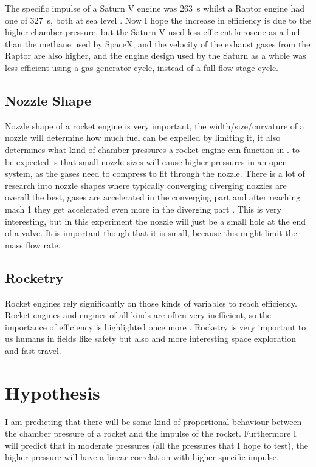 \documentclass[12pt,a4paper]{article}
\begin{document}
The specific impulse of a Saturn V engine was \SI{263}{\second} whilst a Raptor engine had one of \SI{327}{\second}, both at sea level \cite{ref8}. Now I hope the increase in efficiency is due to the higher chamber pressure, but the Saturn V used less efficient kerosene as a fuel than the methane used by SpaceX, and the velocity of the exhaust gases from the Raptor are also higher, and the engine design used by the Saturn as a whole was less efficient using a gas generator cycle, instead of a full flow stage cycle.

\subsection{Nozzle Shape}

Nozzle shape of a rocket engine is very important, the width/size/curvature of a nozzle will determine how much fuel can be expelled by limiting it, it also determines what kind of chamber pressures a rocket engine can function in \cite{ref10}. to be expected is that small nozzle sizes will cause higher pressures in an open system, as the gases need to compress to fit through the nozzle. There is a lot of research into nozzle shapes where typically converging diverging nozzles are overall the best, gases are accelerated in the converging part and after reaching mach 1 they get accelerated even more in the diverging part \cite{ref11}. This is very interesting, but in this experiment the nozzle will just be a small hole at the end of a valve. It is important though that it is small, because this might limit the mass flow rate.

\subsection{Rocketry}

Rocket engines rely significantly on those kinds of variables to reach efficiency. Rocket engines and engines of all kinds are often very inefficient, so the importance of efficiency is highlighted once more \cite{ref12,ref13}. Rocketry is very important to us humans in fields like safety but also and more interesting space exploration and fast travel.

\section{Hypothesis}

I am predicting that there will be some kind of proportional behaviour between the chamber pressure of a rocket and the impulse of the rocket. Furthermore I will predict that in moderate pressures (all the pressures that I hope to test), the higher pressure will have a linear correlation with higher specific impulse.
\end{document}
